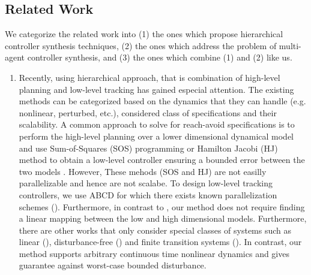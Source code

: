 \subsection{Related Work}

We categorize the related work into (1) the ones which propose hierarchical controller synthesis techniques, (2) the ones which address the problem of multi-agent controller synthesis, and (3) the ones which combine (1) and (2) like us.

\begin{enumerate}[(1)]
	\item Recently, using hierarchical approach, that is combination of high-level planning and low-level tracking has gained especial attention. The existing methods can be categorized based on the dynamics that they can handle (e.g. nonlinear, perturbed, etc.), considered class of specifications and their scalability. A common approach to solve for reach-avoid specifications is to perform the high-level planning over a lower dimensional dynamical model and use
	Sum-of-Squares (SOS) programming or Hamilton Jacobi (HJ) method to obtain a low-level controller ensuring a bounded error between the two models \cite{herbert2017fastrack,DBLP:journals/corr/abs-1911-09773,singh2018robust}. However, These mehods (SOS and HJ) are not easilly parallelizable and hence are not scalabe. To design low-level tracking controllers, we use ABCD for which there exists known parallelization schemes (\cite{KhaledZ19pfaces}). Furthermore, in contrast to \cite{herbert2017fastrack,singh2018robust}, our method does not require finding a linear mapping between the low and high dimensional models. Furthermore, there are other works that only consider special classes of systems such as linear (\cite{fan2018controller,wongpiromsarn2012receding}), disturbance-free (\cite{tedrake2010lqr,fan2020fast}) and finite transition systems (\cite{Yang2017milp}). In contrast, our method supports arbitrary continuous time nonlinear dynamics and gives guarantee against worst-case bounded disturbance.
	

\end{enumerate}
